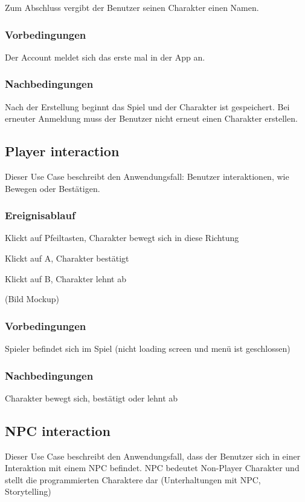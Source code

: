 			Zum Abschluss vergibt der Benutzer seinen Charakter einen Namen.
	
		\subsubsection{Vorbedingungen}
			Der Account meldet sich das erste mal in der App an.
			
		\subsubsection{Nachbedingungen}
			Nach der Erstellung beginnt das Spiel und der Charakter ist gespeichert. Bei erneuter Anmeldung muss der Benutzer nicht erneut einen Charakter erstellen.
	
	\subsection{Player interaction}
		Dieser Use Case beschreibt den Anwendungsfall: Benutzer interaktionen, wie Bewegen oder Bestätigen.
			
		\subsubsection{Ereignisablauf}
			Klickt auf Pfeiltasten, Charakter bewegt sich in diese Richtung
			
			Klickt auf A, Charakter bestätigt
			
			Klickt auf B, Charakter lehnt ab
			
			(Bild Mockup)
			
		\subsubsection{Vorbedingungen}
			Spieler befindet sich im Spiel (nicht loading screen und menü ist geschlossen)
			
		\subsubsection{Nachbedingungen}
			Charakter bewegt sich, bestätigt oder lehnt ab
	
	\subsection{NPC interaction}
		Dieser Use Case beschreibt den Anwendungsfall, dass der Benutzer sich in einer Interaktion mit einem NPC befindet. NPC bedeutet Non-Player Charakter und stellt die programmierten Charaktere dar (Unterhaltungen mit NPC, Storytelling)
			
